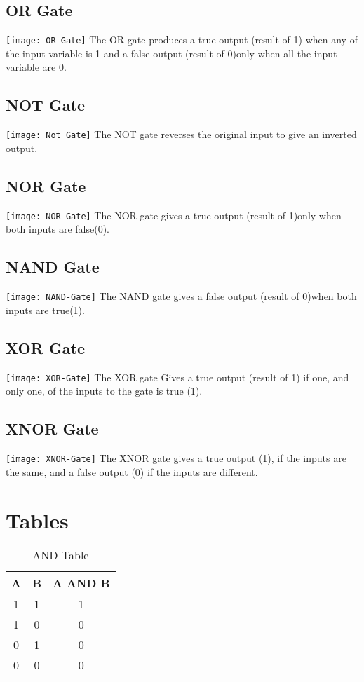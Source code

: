 \documentclass{article}
\begin{document}
\subsection{OR Gate}
\texttt{[image: OR-Gate]}%
The OR gate produces a true output (result of 1) when any of the input variable is 1 and a false output (result of 0)only when all the input variable are 0.
\subsection{NOT Gate}
\texttt{[image: Not Gate]}%
The NOT gate reverses the original input to give an inverted output.
\subsection{NOR Gate}
\texttt{[image: NOR-Gate]}%
The NOR gate gives a true output (result of 1)only when both inputs are false(0).
\subsection{NAND Gate}
\texttt{[image: NAND-Gate]}%
The NAND gate gives a false output (result of 0)when both inputs are true(1).
\subsection{XOR Gate}
\texttt{[image: XOR-Gate]}%
The XOR gate Gives a true output (result of 1) if one, and only one, of the inputs to the gate is true (1).
\subsection{XNOR Gate}
\texttt{[image: XNOR-Gate]}%
The XNOR gate gives a true output (1), if the inputs are the same, and a false output (0) if the inputs are different.
		
		
		
\section{Tables}
\begin{table}
	\begin{center}
		\label{tab:and}
		\caption{AND-Table}
		\begin{tabular}{|c|c|c|}
			A & B & A AND B\\
			\hline
			1&1&1\\
			1&0&0\\
			0&1&0\\
			0&0&0\\
		\end{tabular}
	\end{center}
\end{table}
\end{document}
